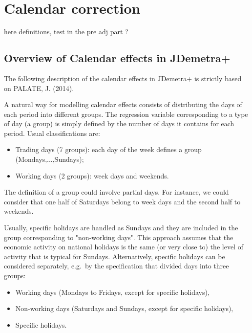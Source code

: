\documentclass[
  letterpaper,
  DIV=11,
  numbers=noendperiod]{scrreprt}
\begin{document}
\hypertarget{calendar-correction}{%
\section{Calendar correction}\label{calendar-correction}}

here definitions, test in the pre adj part ?

\hypertarget{overview-of-calendar-effects-in-jdemetra}{%
\subsection{Overview of Calendar effects in
JDemetra+}\label{overview-of-calendar-effects-in-jdemetra}}

The following description of the calendar effects in JDemetra+ is
strictly based on PALATE, J. (2014).

A natural way for modelling calendar effects consists of distributing
the days of each period into different groups. The regression variable
corresponding to a type of day (a group) is simply defined by the number
of days it contains for each period. Usual classifications are:

\begin{itemize}
\item
  Trading days (7 groups): each day of the week defines a group
  (Mondays,...,Sundays);
\item
  Working days (2 groups): week days and weekends.
\end{itemize}

The definition of a group could involve partial days. For instance, we
could consider that one half of Saturdays belong to week days and the
second half to weekends.

Usually, specific holidays are handled as Sundays and they are included
in the group corresponding to "non-working days". This approach assumes
that the economic activity on national holidays is the same (or very
close to) the level of activity that is typical for Sundays.
Alternatively, specific holidays can be considered separately, e.g.~by
the specification that divided days into three groups:

\begin{itemize}
\item
  Working days (Mondays to Fridays, except for specific holidays),
\item
  Non-working days (Saturdays and Sundays, except for specific
  holidays),
\item
  Specific holidays.
\end{itemize}
\end{document}
